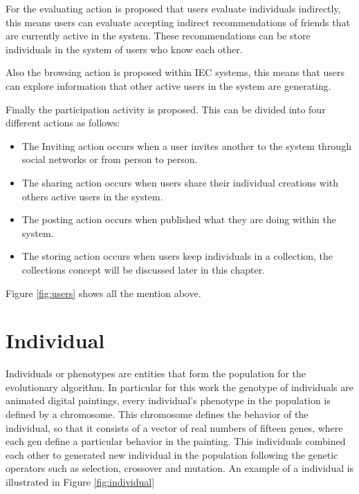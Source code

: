 For the evaluating action is proposed that users evaluate individuals
indirectly, this means users can evaluate accepting indirect recommendations of
friends that are currently active in the system. These recommendations can be
store individuals in the system of users who know each other.

Also the browsing action is proposed within IEC systems, this means that users
can explore information that other active users in the system are generating.

Finally the participation activity is proposed. This can be divided into four
different actions as follows:


\begin{itemize}
\item The Inviting action occurs when a user invites another to the system through social networks or from person to person.
\item The sharing action occurs when users share their individual creations with others active users in the system.
\item The posting action occurs when published what they are doing within the system.
\item The storing action occurs when users keep individuals in a collection, the collections concept will be discussed later in this chapter.
\end{itemize}

Figure \ref{fig:users} shows all the mention above.

\section{Individual}

Individuals or phenotypes are entities that form the population for the evolutionary
algorithm. In particular for this work the genotype of individuals
are animated digital
paintings, every individual's phenotype in the population is defined by a chromosome.
This chromosome defines the behavior of the individual, so that it consists of a
vector of real numbers of fifteen genes, where each gen define a particular
behavior in the painting. This individuals combined each other to generated new
individual in the population following the genetic operators such as selection,
crossover and mutation. An example of a individual is
illustrated in Figure \ref{fig:individual}



